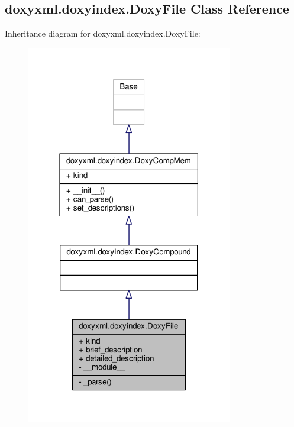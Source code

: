 \subsection{doxyxml.\+doxyindex.\+Doxy\+File Class Reference}
\label{classdoxyxml_1_1doxyindex_1_1DoxyFile}


Inheritance diagram for doxyxml.\+doxyindex.\+Doxy\+File\+:
\nopagebreak
\begin{figure}[H]
\begin{center}
\leavevmode
\includegraphics[width=255pt]{d8/d59/classdoxyxml_1_1doxyindex_1_1DoxyFile__inherit__graph}
\end{center}
\end{figure}


